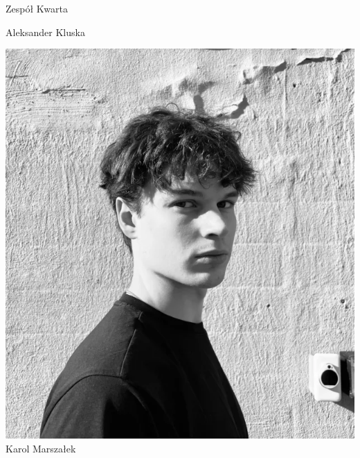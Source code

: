 \begin{frame}[t]{Zespół Kwarta}
\begin{minipage}{0.22\linewidth}
\scriptsize Aleksander Kluska \\
\scriptsize {}
\end{minipage}

\vspace{1.5em}\pause

\begin{minipage}{0.22\linewidth}
\centering
\includegraphics[width=\linewidth]{img/KM}\\
\scriptsize Karol Marszałek \\
\scriptsize {}
\end{minipage}\pause
\hspace{2em}
\begin{minipage}{0.22\linewidth}
\centering

\end{minipage}
\end{frame}
